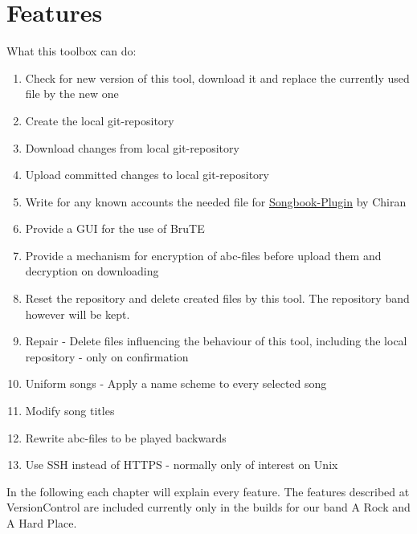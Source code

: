 \documentclass[10pt,a4paper,oneside]{article}
\begin{document}
\newpage
\section{Features}
What this toolbox can do: \\
\begin{enumerate}
\item Check for new version of this tool, download it and replace the currently used file by the new one
\item Create the local git-repository
\item Download changes from local git-repository
\item Upload committed changes to local git-repository
\item Write for any known accounts the needed file for \href{http://www.lotrointerface.com/downloads/download380-Songbook}{Songbook-Plugin} by Chiran
\item Provide a GUI for the use of BruTE
\item Provide a mechanism for encryption of abc-files before upload them and decryption on downloading
\item Reset the repository and delete created files by this tool. The repository band however will be kept.
\item Repair - Delete files influencing the behaviour of this tool, including the local repository - only on confirmation
\item Uniform songs - Apply a name scheme to every selected song
\item Modify song titles
\item Rewrite abc-files to be played backwards
\item Use SSH instead of HTTPS - normally only of interest on Unix
\end{enumerate}
In the following each chapter will explain every feature. The features described at VersionControl are included currently only in the builds for our band A Rock and A Hard Place.
\end{document}
